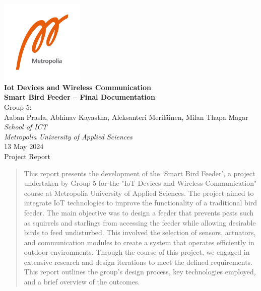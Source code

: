 \documentclass[12pt,a4paper]{article}
\begin{document}
\setlength{\parskip}{0.5em}


\begin{titlepage}
    \centering
    \includegraphics[width=0.3\textwidth]{images/Metropolia_Logo.jpeg}\\[1cm] %
    {\large \bfseries Iot Devices and Wireless Communication\\[0.5cm]}
    {\huge\bfseries Smart Bird Feeder – Final Documentation\\[0.5cm]}
    {\large Group 5:\\
    Aaban Prasla, Abhinav Kayastha, Aleksanteri Meriläinen, Milan Thapa Magar\\
    \textit{School of ICT}\\
    \textit{Metropolia University of Applied Sciences}\\[0.5cm]}
    {\large 13 May 2024\\[1cm]}
    \vfill
    {\large Project Report}
    \vfill
\end{titlepage}

\begin{abstract}
    This report presents the development of the ‘Smart Bird Feeder’, a project undertaken by Group 5 for the "IoT Devices and Wireless Communication" course at Metropolia University of Applied Sciences. The project aimed to integrate IoT technologies to improve the functionality of a traditional bird feeder. The main objective was to design a feeder that prevents pests such as squirrels and starlings from accessing the feeder while allowing desirable birds to feed undisturbed. This involved the selection of sensors, actuators, and communication modules to create a system that operates efficiently in outdoor environments. Through the course of this project, we engaged in extensive research and design iterations to meet the defined requirements. This report outlines the group’s design process, key technologies employed, and a brief overview of the outcomes.\end{abstract}

\newpage
\tableofcontents
\newpage
\end{document}
